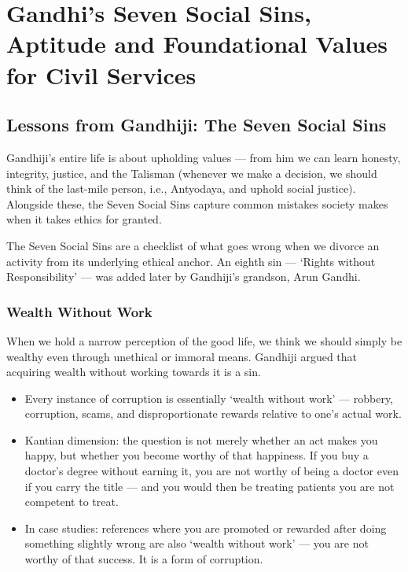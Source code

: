
\chapter{Gandhi's Seven Social Sins, Aptitude and Foundational Values for Civil Services}


\vspace{14pt}

\section{Lessons from Gandhiji: The Seven Social Sins}

Gandhiji's entire life is about upholding values --- from him we can learn honesty, integrity, justice, and the Talisman (whenever we make a decision, we should think of the last-mile person, i.e., Antyodaya, and uphold social justice). Alongside these, the Seven Social Sins capture common mistakes society makes when it takes ethics for granted.

\begin{KeyConcept}
The Seven Social Sins are a checklist of what goes wrong when we divorce an activity from its underlying ethical anchor. An eighth sin --- `Rights without Responsibility' --- was added later by Gandhiji's grandson, Arun Gandhi.
\end{KeyConcept}

\subsection{Wealth Without Work}

When we hold a narrow perception of the good life, we think we should simply be wealthy even through unethical or immoral means. Gandhiji argued that acquiring wealth without working towards it is a sin.

\begin{itemize}
\item Every instance of corruption is essentially `wealth without work' --- robbery, corruption, scams, and disproportionate rewards relative to one's actual work.
\item Kantian dimension: the question is not merely whether an act makes you happy, but whether you become worthy of that happiness. If you buy a doctor's degree without earning it, you are not worthy of being a doctor even if you carry the title --- and you would then be treating patients you are not competent to treat.
\item In case studies: references where you are promoted or rewarded after doing something slightly wrong are also `wealth without work' --- you are not worthy of that success. It is a form of corruption.
\end{itemize}

